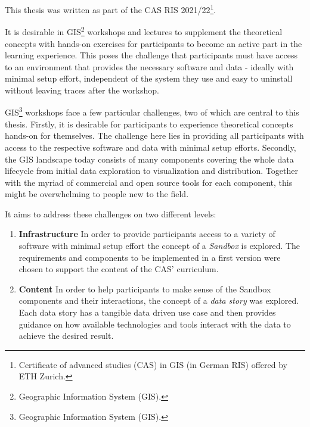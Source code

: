 \documentclass[11pt, a4paper, oneside, parskip=full-]{scrartcl}
\begin{document}
This thesis was written as part of the CAS RIS 2021/22\footnote{Certificate of
advanced studies (CAS) in GIS (in German RIS) offered by ETH Zurich.}.

It is desirable in GIS\footnote{Geographic Information System (GIS).} workshops
and lectures to supplement the theoretical concepts with hands-on exercises for
participants to become an active part in the learning experience. This poses the
challenge that participants must have access to an environment that provides the
necessary software and data - ideally with minimal setup effort, independent of
the system they use and easy to uninstall without leaving traces after the
workshop.

GIS\footnote{Geographic Information System (GIS).} workshops face a few
particular challenges, two of which are central to this thesis. Firstly, it is
desirable for participants to experience theoretical concepts hands-on for
themselves. The challenge here lies in providing all participants with access to
the respective software and data with minimal setup efforts. Secondly, the GIS
landscape today consists of many components covering the whole data lifecycle
from initial data exploration to visualization and distribution. Together with
the myriad of commercial and open source tools for each component, this might be
overwhelming to people new to the field.

It aims to address these challenges on two different levels:
\begin{enumerate}
  \item \textbf{Infrastructure} In order to provide participants access to a
  variety of software with minimal setup effort the concept of a \emph{Sandbox}
  is explored. The requirements and components to be implemented in a first
  version were chosen to support the content of the CAS' curriculum.
  \item \textbf{Content} In order to help participants to make sense of the
  Sandbox components and their interactions, the concept of a \emph{data story}
  was explored. Each data story has a tangible data driven use case and then
  provides guidance on how available technologies and tools interact with the
  data to achieve the desired result.
\end{enumerate}





\end{document}
